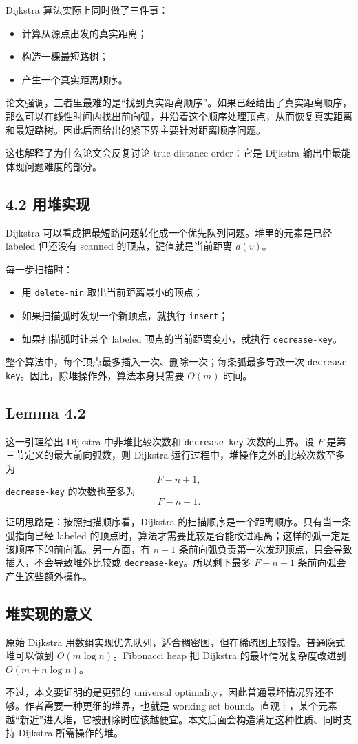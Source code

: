 \documentclass[UTF8]{ctexart}
\begin{document}
Dijkstra 算法实际上同时做了三件事：

\begin{itemize}
  \item 计算从源点出发的真实距离；
  \item 构造一棵最短路树；
  \item 产生一个真实距离顺序。
\end{itemize}

论文强调，三者里最难的是“找到真实距离顺序”。如果已经给出了真实距离顺序，那么可以在线性时间内找出前向弧，并沿着这个顺序处理顶点，从而恢复真实距离和最短路树。因此后面给出的紧下界主要针对距离顺序问题。

这也解释了为什么论文会反复讨论 true distance order：它是 Dijkstra 输出中最能体现问题难度的部分。

\subsection*{4.2 用堆实现}

Dijkstra 可以看成把最短路问题转化成一个优先队列问题。堆里的元素是已经 labeled 但还没有 scanned 的顶点，键值就是当前距离 \(d(v)\)。

每一步扫描时：

\begin{itemize}
  \item 用 \texttt{delete-min} 取出当前距离最小的顶点；
  \item 如果扫描弧时发现一个新顶点，就执行 \texttt{insert}；
  \item 如果扫描弧时让某个 labeled 顶点的当前距离变小，就执行 \texttt{decrease-key}。
\end{itemize}

整个算法中，每个顶点最多插入一次、删除一次；每条弧最多导致一次 \texttt{decrease-key}。因此，除堆操作外，算法本身只需要 \(O(m)\) 时间。

\subsection*{Lemma 4.2}

这一引理给出 Dijkstra 中非堆比较次数和 \texttt{decrease-key} 次数的上界。设 \(F\) 是第三节定义的最大前向弧数，则 Dijkstra 运行过程中，堆操作之外的比较次数至多为
\[
F-n+1,
\]
\texttt{decrease-key} 的次数也至多为
\[
F-n+1.
\]

证明思路是：按照扫描顺序看，Dijkstra 的扫描顺序是一个距离顺序。只有当一条弧指向已经 labeled 的顶点时，算法才需要比较是否能改进距离；这样的弧一定是该顺序下的前向弧。另一方面，有 \(n-1\) 条前向弧负责第一次发现顶点，只会导致插入，不会导致堆外比较或 \texttt{decrease-key}。所以剩下最多 \(F-n+1\) 条前向弧会产生这些额外操作。

\subsection*{堆实现的意义}

原始 Dijkstra 用数组实现优先队列，适合稠密图，但在稀疏图上较慢。普通隐式堆可以做到 \(O(m\log n)\)。Fibonacci heap 把 Dijkstra 的最坏情况复杂度改进到 \(O(m+n\log n)\)。

不过，本文要证明的是更强的 universal optimality，因此普通最坏情况界还不够。作者需要一种更细的堆界，也就是 working-set bound。直观上，某个元素越“新近”进入堆，它被删除时应该越便宜。本文后面会构造满足这种性质、同时支持 Dijkstra 所需操作的堆。
\end{document}
